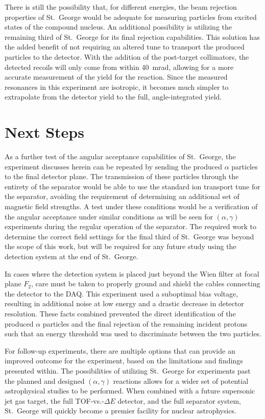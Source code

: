 There is still the possibility that, for different energies, the beam
rejection properties of St.\ George would be adequate for measuring
particles from excited states of the compound nucleus. An additional
possibility is utilizing the remaining third of St.\ George for its
final rejection capabilities. This solution has the added benefit of not
requiring an altered tune to transport the produced particles to the
detector. With the addition of the post-target collimators, the detected
recoils will only come from within 40~mrad, allowing for a more accurate
measurement of the yield for the reaction. Since the measured resonances
in this experiment are isotropic, it becomes much simpler to extrapolate
from the detector yield to the full, angle-integrated yield.


\section{Next Steps}
\label{sec:next-steps}

As a further test of the angular acceptance capabilities of St.\ George,
the experiment discusses herein can be repeated by sending the produced
$\alpha$ particles to the final detector plane. The transmission of
these particles through the entirety of the separator would be able to
use the standard ion transport tune for the separator, avoiding the
requirement of determining an additional set of magnetic field
strengths. A test under these conditions would be a verification of the
angular acceptance under similar conditions as will be seen for
$(\alpha,\gamma)$ experiments during the regular operation of the
separator. The required work to determine the correct field settings for
the final third of St.\ George was beyond the scope of this work, but
will be required for any future study using the detection system at the
end of St.\ George.

In cases where the detection system is placed just beyond the Wien
filter at focal plane $F_2$, care must be taken to properly ground and
shield the cables connecting the detector to the DAQ. This experiment
used a suboptimal bias voltage, resulting in additional noise at low
energy and a drastic decrease in detector resolution. These facts
combined prevented the direct identification of the produced $\alpha$
particles and the final rejection of the remaining incident protons such
that an energy threshold was used to discriminate between the two
particles.

For follow-up experiments, there are multiple options that can provide
an improved outcome for the experiment, based on the limitations and
findings presented within. The possibilities of utilizing St.\ George
for experiments past the planned and designed $(\alpha,\gamma)$
reactions allows for a wider set of potential astrophysical studies to
be performed. When combined with a future supersonic jet gas target, the
full TOF-vs.-$\Delta E$ detector, and the full separator system, St.\
George will quickly become a premier facility for nuclear astrophysics.


